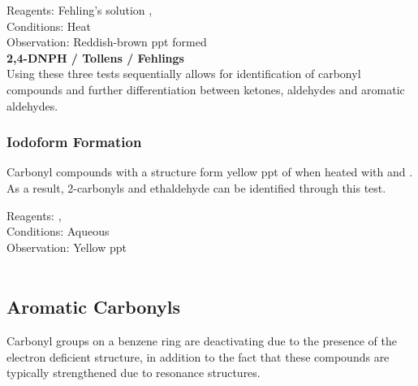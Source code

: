 \documentclass[../main]{subfiles}
\begin{document}
	Reagents: Fehling's solution ,  \\
	Conditions: Heat \\
	Observation: Reddish-brown ppt formed \\

	\noindent \textbf{2,4-DNPH / Tollens / Fehlings} \\

	Using these three tests sequentially allows for identification of carbonyl compounds and further differentiation between ketones, aldehydes and aromatic aldehydes. \\

	\subsubsection{Iodoform Formation}

	Carbonyl compounds with a  structure form yellow ppt of  when heated with  and . As a result, 2-carbonyls and ethaldehyde can be identified through this test.

	Reagents: ,  \\
	Conditions: Aqueous \\
	Observation: Yellow ppt  \\

	 \\

	\subsection{Aromatic Carbonyls}

	Carbonyl groups on a benzene ring are deactivating due to the presence of the electron deficient  structure, in addition to the fact that these compounds are typically strengthened due to resonance structures. \\

	
\end{document}
